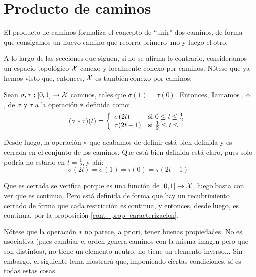 \section{Producto de caminos}

El producto de caminos formaliza el concepto de ``unir'' dos caminos, de forma que consigamos un nuevo camino que recorra primero uno y luego el otro.

A lo largo de las secciones que siguen, si no se afirma lo contrario, consideramos un espacio topológico $\mathcal{X}$ conexo y localmente conexo por caminos. Nótese que ya hemos visto que, entonces, $\mathcal{X}$ es también conexo por caminos.

\begin{defi}
	Sean $\sigma,\tau: [0,1]\to\mathcal{X}$ caminos, tales que $\sigma(1)=\tau(0)$. Entonces, llamamos , o , de $\sigma$ y $\tau$ a la operación ${\mathbin{*}}$ definida como:
	\[(\sigma\mathbin{*}\tau)(t)=\left\{\begin{array}{ll}
	\sigma(2t) & \text{si } 0\leq t\leq \frac{1}{2} \\
	\tau(2t-1) & \text{si } \frac{1}{2}\leq t\leq 1
	\end{array}\right.\]
\end{defi}

\begin{obs}
	Desde luego, la operación ${\mathbin{*}}$ que acabamos de definir está bien definida y es cerrada en el conjunto de los caminos. Que está bien definida está claro, pues solo podría no estarlo en $t=\frac{1}{2}$, y ahí:
	\[\sigma(2t)=\sigma(1)=\tau(0)=\tau(2t-1)\]
	
	Que es cerrada se verifica porque es una función de $[0,1]\to\mathcal{X}$, luego basta con ver que es continua. Pero está definida de forma que hay un recubrimiento cerrado de forma que cada restricción es continua, y entonces, desde luego, es continua, por la proposición \ref{cont_prop_caracterizacion}.
\end{obs}

\begin{obs}
	Nótese que la operación ${\mathbin{*}}$ no parece, a priori, tener buenas propiedades. No es asociativa (pues cambiar el orden genera caminos con la misma imagen pero que son distintos), no tiene un elemento neutro, no tiene un elemento inverso... Sin embargo, el siguiente lema mostrará que, imponiendo ciertas condiciones, sí es todas estas cosas.
\end{obs}

